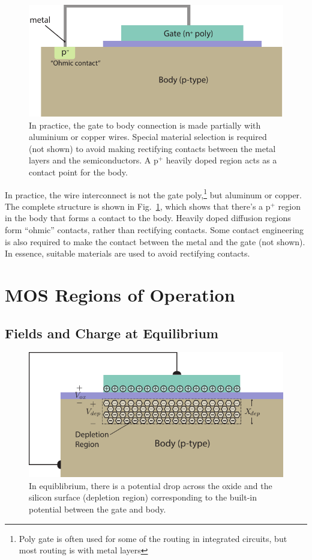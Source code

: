 \begin{figure}[tbh]
\begin{center}
\includegraphics[width=.75\columnwidth]{mos_cap_metal_short}
\end{center}
\caption{In practice, the gate to body connection is made partially with aluminium or copper wires.  Special material selection is required (not shown) to avoid making rectifying contacts between the metal layers and the semiconductors.  A p$^+$ heavily doped region acts as a contact point for the body. } \label{fig:mos_cap_gate_body_short_wire}
\end{figure}

In practice, the wire interconnect is not the gate poly,\footnote{Poly gate is often used for some of the routing in integrated circuits, but most routing is with metal layers}  but aluminum or copper.  The complete structure is shown in Fig.~\ref{fig:mos_cap_gate_body_short_wire}, which shows that there's a p$^+$ region in the body that forms a contact to the body.  Heavily doped diffusion regions form “ohmic” contacts, rather than rectifying contacts.   Some contact engineering is also required to make the contact between the metal and the gate (not shown). In essence, suitable materials are used to avoid rectifying contacts.  
 
\section{MOS Regions of Operation}


\subsection{Fields and Charge at Equilibrium}

\begin{figure}[tbh]
\begin{center}
\includegraphics[width=.75\columnwidth]{mos_cap_equilibrium}
\end{center}
\caption{In equiblibrium, there is a potential drop across the oxide and the silicon surface (depletion region) corresponding to the built-in potential between the gate and body. } \label{fig:mos_charge_equil}
\end{figure}

